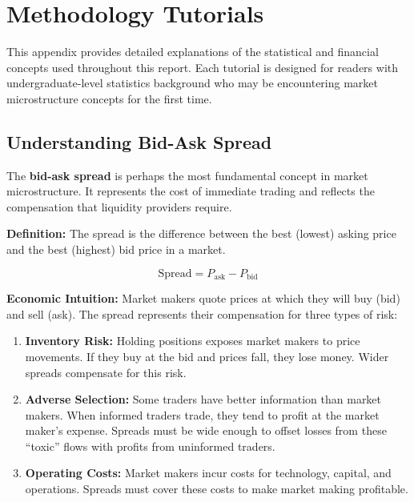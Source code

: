
\section{Methodology Tutorials}
\label{sec:methodology-appendix}

{\small
This appendix provides detailed explanations of the statistical and financial concepts used throughout this report. Each tutorial is designed for readers with undergraduate-level statistics background who may be encountering market microstructure concepts for the first time.}

\subsection{Understanding Bid-Ask Spread}
\label{method:spread-appendix}

The \textbf{bid-ask spread} is perhaps the most fundamental concept in market microstructure. It represents the cost of immediate trading and reflects the compensation that liquidity providers require.

\textbf{Definition:} The spread is the difference between the best (lowest) asking price and the best (highest) bid price in a market.

\begin{equation}
\text{Spread} = P_{\text{ask}} - P_{\text{bid}}
\end{equation}

\textbf{Economic Intuition:} Market makers quote prices at which they will buy (bid) and sell (ask). The spread represents their compensation for three types of risk:

\begin{enumerate}
    \item \textbf{Inventory Risk:} Holding positions exposes market makers to price movements. If they buy at the bid and prices fall, they lose money. Wider spreads compensate for this risk.

    \item \textbf{Adverse Selection:} Some traders have better information than market makers. When informed traders trade, they tend to profit at the market maker's expense. Spreads must be wide enough to offset losses from these ``toxic'' flows with profits from uninformed traders.

    \item \textbf{Operating Costs:} Market makers incur costs for technology, capital, and operations. Spreads must cover these costs to make market making profitable.
\end{enumerate}

